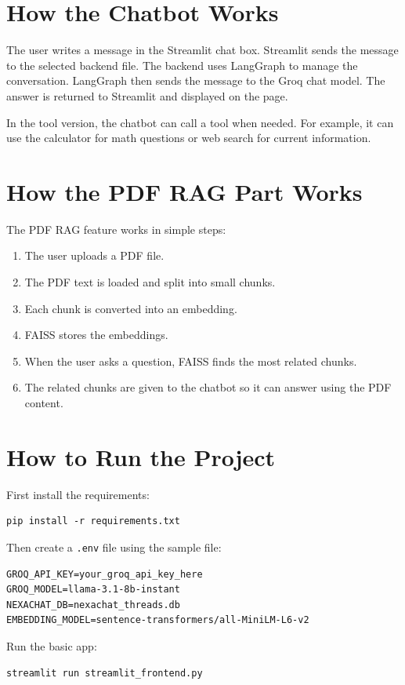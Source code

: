 \documentclass[12pt]{article}
\begin{document}
\section{How the Chatbot Works}
The user writes a message in the Streamlit chat box. Streamlit sends the message to the selected backend file. The backend uses LangGraph to manage the conversation. LangGraph then sends the message to the Groq chat model. The answer is returned to Streamlit and displayed on the page.

In the tool version, the chatbot can call a tool when needed. For example, it can use the calculator for math questions or web search for current information.

\section{How the PDF RAG Part Works}
The PDF RAG feature works in simple steps:
\begin{enumerate}[leftmargin=*]
    \item The user uploads a PDF file.
    \item The PDF text is loaded and split into small chunks.
    \item Each chunk is converted into an embedding.
    \item FAISS stores the embeddings.
    \item When the user asks a question, FAISS finds the most related chunks.
    \item The related chunks are given to the chatbot so it can answer using the PDF content.
\end{enumerate}

\section{How to Run the Project}
First install the requirements:
\begin{verbatim}
pip install -r requirements.txt
\end{verbatim}

Then create a \texttt{.env} file using the sample file:
\begin{verbatim}
GROQ_API_KEY=your_groq_api_key_here
GROQ_MODEL=llama-3.1-8b-instant
NEXACHAT_DB=nexachat_threads.db
EMBEDDING_MODEL=sentence-transformers/all-MiniLM-L6-v2
\end{verbatim}

Run the basic app:
\begin{verbatim}
streamlit run streamlit_frontend.py
\end{verbatim}
\end{document}
